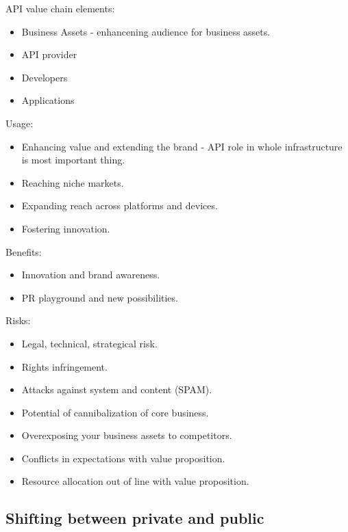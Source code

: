 \documentclass[11pt,a4paper]{article}
\begin{document}
API value chain elements:
\begin{itemize}
	\item Business Assets - enhancening audience for business assets.
	\item API provider
	\item Developers
	\item Applications
\end{itemize}

Usage:
\begin{itemize}
	\item Enhancing value and extending the brand - API role in whole infrastructure is most important thing.
	\item Reaching niche markets.
	\item Expanding reach across platforms and devices.
	\item Fostering innovation.
\end{itemize}

Benefits:
\begin{itemize}
	\item Innovation and brand awareness.
	\item PR playground and new possibilities.
\end{itemize}

Risks:
\begin{itemize}
	\item Legal, technical, strategical risk.
	\item Rights infringement.
	\item Attacks against system and content (SPAM).
	\item Potential of cannibalization of core business.
	\item Overexposing your business assets to competitors.
	\item Conflicts in expectations with value proposition.	
	\item Resource allocation out of line with value proposition.
\end{itemize}

\subsection{Shifting between private and public}
\end{document}
